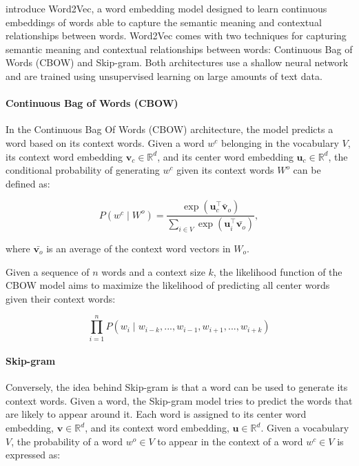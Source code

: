 \citet{mikolov2013efficient} introduce Word2Vec, a word embedding model designed to learn continuous embeddings of words able to capture the semantic meaning and contextual relationships between words. Word2Vec comes with two techniques for capturing semantic meaning and contextual relationships between words: Continuous Bag of Words (CBOW) and Skip-gram. Both architectures use a shallow neural network and are trained using unsupervised learning on large amounts of text data.

\paragraph{Continuous Bag of Words (CBOW)} 
In the Continuous Bag Of Words (CBOW) architecture, the model predicts a word based on its context words. Given a word $w^c$ belonging in the vocabulary $V$, its context word embedding $\bm{v}_c \in \mathbb{R}^{d}$, and its center word embedding $\bm{u}_c \in \mathbb{R}^{d}$, the conditional probability of generating $w^c$ given its context words $W^o$ can be defined as:

\begin{equation}
    P(w^c \mid W^o) = \frac{\exp(\bm{u}_c^{\top}\bar{\bm{v}}_o)}{\sum_{i \in V} \exp(\bm{u}_{i}^{\top}\bar{\bm{v}_o})},
\end{equation}

where $\bar{\bm{v}_o}$ is an average of the context word vectors in $W_o$.

Given a sequence of $n$ words and a context size $k$, the likelihood function of the CBOW model aims to maximize the likelihood of predicting all center words given their context words:

\begin{equation}
    \prod_{i=1}^{n} P(w_i \mid w_{i-k}, ..., w_{i-1},  w_{i+1}, ..., w_{i+k})
\end{equation}

\paragraph{Skip-gram} 

Conversely, the idea behind Skip-gram is that a word can be used to generate its context words. Given a word, the Skip-gram model tries to predict the words that are likely to appear around it. Each word is assigned to its center word embedding, $\bm{v} \in \mathbb{R}^{d}$, and its context word embedding, $\bm{u} \in \mathbb{R}^{d}$. Given a vocabulary $V$, the  probability of a word $w^o \in V$ to appear in the context of a word $w^c \in V$ is expressed as:

